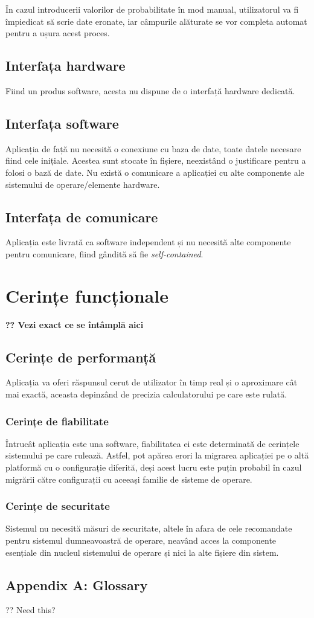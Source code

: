 \documentclass{scrreprt}
\begin{document}
În cazul introducerii valorilor de probabilitate în mod manual, utilizatorul va fi împiedicat să scrie date eronate, iar câmpurile alăturate se vor completa automat pentru a ușura acest proces.


\section{Interfața hardware}
Fiind un produs software, acesta nu dispune de o interfață hardware dedicată.

\section{Interfața software}
Aplicația de față nu necesită o conexiune cu baza de date, toate datele necesare fiind cele inițiale. Acestea sunt stocate în fișiere, neexistând o justificare pentru a folosi o bază de date. Nu există o comunicare a aplicației cu alte componente ale sistemului de operare/elemente hardware.

\section{Interfața de comunicare}
Aplicația este livrată ca software independent și nu necesită alte componente pentru comunicare, fiind gândită să fie \textit{self-contained}.

\chapter{Cerințe funcționale}
\textbf{?? Vezi exact ce se întâmplă aici}

\section{Cerințe de performanță}
Aplicația va oferi răspunsul cerut de utilizator în timp real și o aproximare cât mai exactă, aceasta depinzând de precizia calculatorului pe care este rulată.

\subsection{Cerințe de fiabilitate}
Întrucât aplicația este una software, fiabilitatea ei este determinată de cerințele sistemului pe care rulează. Astfel, pot apărea erori la migrarea aplicației pe o altă platformă cu o configurație diferită, deși acest lucru este puțin probabil în cazul migrării către configurații cu aceeași familie de sisteme de operare.

\subsection{Cerințe de securitate}
Sistemul nu necesită măsuri de securitate, altele în afara de cele recomandate pentru sistemul dumneavoastră de operare, neavând acces la componente esențiale din nucleul sistemului de operare și nici la alte fișiere din sistem.

\section{Appendix A: Glossary}
?? Need this?
\end{document}

